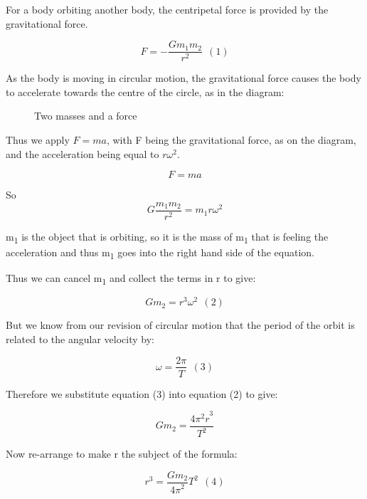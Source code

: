 \documentclass[a4paper,11pt,twoside]{memoir}
\begin{document}
For a body orbiting another body, the centripetal force is provided by
the gravitational force.

\[F = - \frac{Gm_{1}m_{2}}{r^{2}}\ \ (1)\]

As the body is moving in circular motion, the gravitational force causes
the body to accelerate towards the centre of the circle, as in the
diagram:

\begin{figure}[h]
  \begin{center}
  \end{center}
  \label{masses-2}
  \caption{Two masses and a force}
\end{figure}

Thus we apply $F=ma$, with F being the gravitational force, as on the
diagram, and the acceleration being equal to $r\omega^2$.

\[F = ma\]

So \[G\frac{m_{1}m_{2}}{r^{2}} = m_{1}r\omega^{2}\]

m\textsubscript{1} is the object that is orbiting, so it is the mass of
m\textsubscript{1} that is feeling the acceleration and thus
m\textsubscript{1} goes into the right hand side of the equation.

Thus we can cancel m\textsubscript{1} and collect the terms in r to
give:

\[Gm_{2} = r^{3}\omega^{2}\ \ (2)\]

But we know from our revision of circular motion that the period of the
orbit is related to the angular velocity by:

\[\omega = \frac{2\pi}{T}\ \ (3)\]

Therefore we substitute equation (3) into equation (2) to give:

\[Gm_{2} = \frac{{4\pi^{2}r}^{3}}{T^{2}}\]

Now re-arrange to make r the subject of the formula:

\[r^{3} = \frac{Gm_{2}}{{4\pi}^{2}}T^{2}\ \ (4)\]
\end{document}

